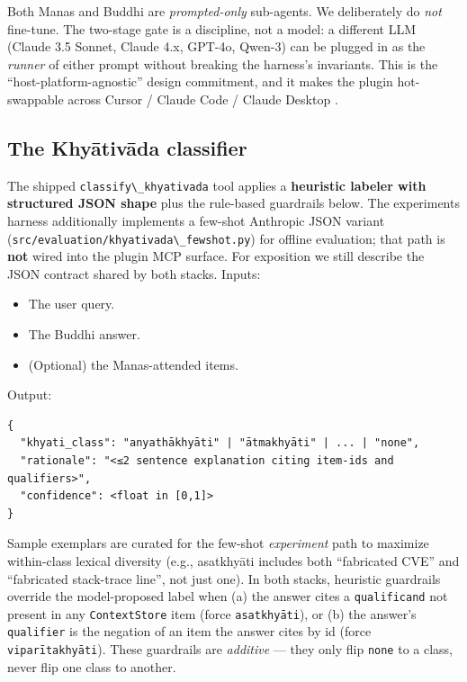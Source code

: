 Both Manas and Buddhi are \emph{prompted-only} sub-agents. We deliberately do \emph{not} fine-tune. The two-stage gate is a discipline, not a model: a different LLM (Claude 3.5 Sonnet, Claude 4.x, GPT-4o, Qwen-3) can be plugged in as the \emph{runner} of either prompt without breaking the harness's invariants. This is the ``host-platform-agnostic'' design commitment, and it makes the plugin hot-swappable across Cursor / Claude Code / Claude Desktop \citep{anthropic2025mcp, cursor2025plugins}.

\subsection{The Khyātivāda classifier}\label{the-khyux101tivux101da-classifier}

The shipped \passthrough{\lstinline!classify\_khyativada!} tool applies a \textbf{heuristic labeler with structured JSON shape} plus the rule-based guardrails below. The experiments harness additionally implements a few-shot Anthropic JSON variant (\passthrough{\lstinline!src/evaluation/khyativada\_fewshot.py!}) for offline evaluation; that path is \textbf{not} wired into the plugin MCP surface. For exposition we still describe the JSON contract shared by both stacks. Inputs:

\begin{itemize}
\tightlist
\item
  The user query.
\item
  The Buddhi answer.
\item
  (Optional) the Manas-attended items.
\end{itemize}

Output:

\begin{lstlisting}
{
  "khyati_class": "anyathākhyāti" | "ātmakhyāti" | ... | "none",
  "rationale": "<≤2 sentence explanation citing item-ids and qualifiers>",
  "confidence": <float in [0,1]>
}
\end{lstlisting}

Sample exemplars are curated for the few-shot \emph{experiment} path to maximize within-class lexical diversity (e.g., asatkhyāti includes both ``fabricated CVE'' and ``fabricated stack-trace line'', not just one). In both stacks, heuristic guardrails override the model-proposed label when (a) the answer cites a \passthrough{\lstinline!qualificand!} not present in any \passthrough{\lstinline!ContextStore!} item (force \passthrough{\lstinline!asatkhyāti!}), or (b) the answer's \passthrough{\lstinline!qualifier!} is the negation of an item the answer cites by id (force \passthrough{\lstinline!viparītakhyāti!}). These guardrails are \emph{additive} --- they only flip \passthrough{\lstinline!none!} to a class, never flip one class to another.

